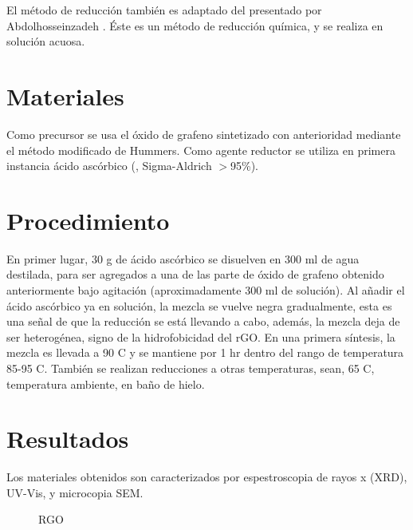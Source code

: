 El método de reducción también es adaptado del presentado por Abdolhosseinzadeh \citep{Abdolhosseinzadeh2015}. Éste es un método de reducción química, y se realiza en solución acuosa.

\section{Materiales}
Como precursor se usa el óxido de grafeno sintetizado con anterioridad mediante el método modificado de Hummers. Como agente reductor se utiliza en primera instancia ácido ascórbico (, Sigma-Aldrich $>$95\%).

\section{Procedimiento}
En primer lugar, 30 g de ácido ascórbico se disuelven en 300 ml de agua destilada, para ser agregados a una de las parte de óxido de grafeno obtenido anteriormente bajo agitación (aproximadamente 300 ml de solución). Al añadir el ácido ascórbico ya en solución, la mezcla se vuelve negra gradualmente, esta es una señal de que la reducción se está llevando a cabo, además, la mezcla deja de ser heterogénea, signo de la hidrofobicidad del rGO. En una primera síntesis, la mezcla es llevada a 90 \degree C y se mantiene por 1 hr dentro del rango de temperatura 85-95 \degree C. También se realizan reducciones a otras temperaturas, sean, 65 \degree C, temperatura ambiente, en baño de hielo.

\section{Resultados}
Los materiales obtenidos son caracterizados por espestroscopia de rayos x (XRD), UV-Vis, y microcopia SEM.

\begin{figure}
	\centering
	\caption{RGO}
	\label{fig:RGO}
\end{figure}

